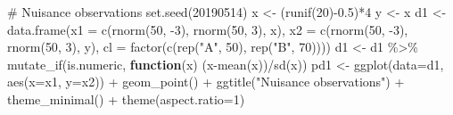\documentclass[
  letterpaper,
]{krantz}
\newenvironment{Shaded}{\begin{snugshade}}{\end{snugshade}}
\newcommand{\AttributeTok}[1]{\textcolor[rgb]{0.40,0.45,0.13}{#1}}
\newcommand{\CommentTok}[1]{\textcolor[rgb]{0.37,0.37,0.37}{#1}}
\newcommand{\ControlFlowTok}[1]{\textcolor[rgb]{0.00,0.23,0.31}{\textbf{#1}}}
\newcommand{\DecValTok}[1]{\textcolor[rgb]{0.68,0.00,0.00}{#1}}
\newcommand{\FloatTok}[1]{\textcolor[rgb]{0.68,0.00,0.00}{#1}}
\newcommand{\FunctionTok}[1]{\textcolor[rgb]{0.28,0.35,0.67}{#1}}
\newcommand{\NormalTok}[1]{\textcolor[rgb]{0.00,0.23,0.31}{#1}}
\newcommand{\OtherTok}[1]{\textcolor[rgb]{0.00,0.23,0.31}{#1}}
\newcommand{\SpecialCharTok}[1]{\textcolor[rgb]{0.37,0.37,0.37}{#1}}
\newcommand{\StringTok}[1]{\textcolor[rgb]{0.13,0.47,0.30}{#1}}
\begin{document}
\begin{Shaded}
\begin{Highlighting}[]
\CommentTok{\# Nuisance observations}
\FunctionTok{set.seed}\NormalTok{(}\DecValTok{20190514}\NormalTok{)}
\NormalTok{x }\OtherTok{\textless{}{-}}\NormalTok{ (}\FunctionTok{runif}\NormalTok{(}\DecValTok{20}\NormalTok{)}\SpecialCharTok{{-}}\FloatTok{0.5}\NormalTok{)}\SpecialCharTok{*}\DecValTok{4}
\NormalTok{y }\OtherTok{\textless{}{-}}\NormalTok{ x}
\NormalTok{d1 }\OtherTok{\textless{}{-}} \FunctionTok{data.frame}\NormalTok{(}\AttributeTok{x1 =} \FunctionTok{c}\NormalTok{(}\FunctionTok{rnorm}\NormalTok{(}\DecValTok{50}\NormalTok{, }\SpecialCharTok{{-}}\DecValTok{3}\NormalTok{), }
                            \FunctionTok{rnorm}\NormalTok{(}\DecValTok{50}\NormalTok{, }\DecValTok{3}\NormalTok{), x),}
                 \AttributeTok{x2 =} \FunctionTok{c}\NormalTok{(}\FunctionTok{rnorm}\NormalTok{(}\DecValTok{50}\NormalTok{, }\SpecialCharTok{{-}}\DecValTok{3}\NormalTok{), }
                            \FunctionTok{rnorm}\NormalTok{(}\DecValTok{50}\NormalTok{, }\DecValTok{3}\NormalTok{), y),}
                 \AttributeTok{cl =} \FunctionTok{factor}\NormalTok{(}\FunctionTok{c}\NormalTok{(}\FunctionTok{rep}\NormalTok{(}\StringTok{"A"}\NormalTok{, }\DecValTok{50}\NormalTok{), }
                             \FunctionTok{rep}\NormalTok{(}\StringTok{"B"}\NormalTok{, }\DecValTok{70}\NormalTok{))))}
\NormalTok{d1 }\OtherTok{\textless{}{-}}\NormalTok{ d1 }\SpecialCharTok{\%\textgreater{}\%} 
  \FunctionTok{mutate\_if}\NormalTok{(is.numeric, }\ControlFlowTok{function}\NormalTok{(x) (x}\SpecialCharTok{{-}}\FunctionTok{mean}\NormalTok{(x))}\SpecialCharTok{/}\FunctionTok{sd}\NormalTok{(x))}
\NormalTok{pd1 }\OtherTok{\textless{}{-}} \FunctionTok{ggplot}\NormalTok{(}\AttributeTok{data=}\NormalTok{d1, }\FunctionTok{aes}\NormalTok{(}\AttributeTok{x=}\NormalTok{x1, }\AttributeTok{y=}\NormalTok{x2)) }\SpecialCharTok{+} 
  \FunctionTok{geom\_point}\NormalTok{() }\SpecialCharTok{+}
    \FunctionTok{ggtitle}\NormalTok{(}\StringTok{"Nuisance observations"}\NormalTok{) }\SpecialCharTok{+} 
  \FunctionTok{theme\_minimal}\NormalTok{() }\SpecialCharTok{+}
    \FunctionTok{theme}\NormalTok{(}\AttributeTok{aspect.ratio=}\DecValTok{1}\NormalTok{) }


\end{Highlighting}
\end{Shaded}
\end{document}

